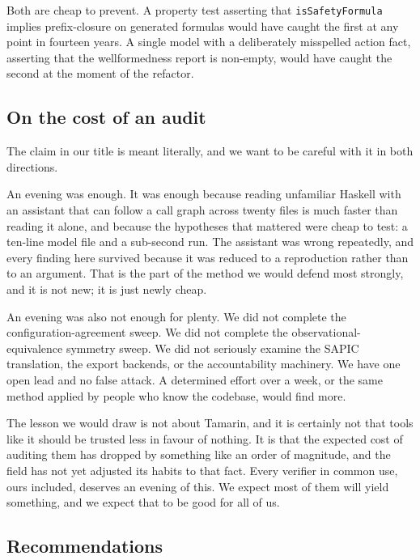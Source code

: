 \documentclass[version=preprint]{iacrcc}
\newcommand{\code}[1]{\texttt{\small #1}}
\theoremstyle{definition}
\theoremstyle{remark}
\begin{document}
Both are cheap to prevent. A property test asserting that
\code{isSafetyFormula} implies prefix-closure on generated formulas would have
caught the first at any point in fourteen years. A single model with a
deliberately misspelled action fact, asserting that the wellformedness report
is non-empty, would have caught the second at the moment of the refactor.

\subsection{On the cost of an audit}

The claim in our title is meant literally, and we want to be careful with it in
both directions.

An evening was enough. It was enough because reading unfamiliar Haskell with an
assistant that can follow a call graph across twenty files is much faster than
reading it alone, and because the hypotheses that mattered were cheap to test:
a ten-line model file and a sub-second run. The assistant was wrong repeatedly,
and every finding here survived because it was reduced to a reproduction rather
than to an argument. That is the part of the method we would defend most
strongly, and it is not new; it is just newly cheap.

An evening was also not enough for plenty. We did not complete the
configuration-agreement sweep. We did not complete the observational-equivalence
symmetry sweep. We did not seriously examine the SAPIC translation, the export
backends, or the accountability machinery. We have one open lead and no false
attack. A determined effort over a week, or the same method applied by people
who know the codebase, would find more.

The lesson we would draw is not about Tamarin, and it is certainly not that
tools like it should be trusted less in favour of nothing. It is that the
expected cost of auditing them has dropped by something like an order of
magnitude, and the field has not yet adjusted its habits to that fact. Every
verifier in common use, ours included, deserves an evening of this. We expect
most of them will yield something, and we expect that to be good for all of us.

\subsection{Recommendations}
\end{document}
